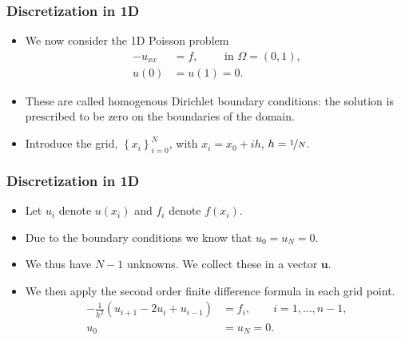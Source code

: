 \begin{frame}[fragile]
  \frametitle{Discretization in 1D}
  \begin{itemize}
  \item We now consider the 1D Poisson problem
    \[
      \begin{split}
        -u_{xx} &= f, \qquad \text{ in } \Omega = (0,1), \\
        u(0) &= u(1) = 0.
      \end{split}
    \]
    \begin{center}
      \scalebox{0.7}{}
    \end{center}
  \item These are called homogenous Dirichlet boundary conditions: the solution
    is prescribed to be zero on the boundaries of the domain.
  \item Introduce the grid, $\left\{x_i\right\}_{i=0}^N$, with $x_i = x_0+ih$,
    $h = \nicefrac{1}{N}$.
    \begin{center}
      
    \end{center}
  \end{itemize}
\end{frame}

\begin{frame}
  \frametitle{Discretization in 1D}
  \begin{itemize}
  \item Let $u_i$ denote $u(x_i)$ and $f_i$ denote $f(x_i)$.
  \item Due to the boundary conditions we know that $u_0 = u_N = 0$.
  \item We thus have $N-1$ unknowns. We collect these in a vector $\bm u$.
  \item We then apply the second order finite difference formula in each grid
    point.
    \begin{align*}
      - \frac{1}{h^2} \left(u_{i+1} - 2u_i + u_{i-1} \right) &= f_i, \qquad i=1,\ldots,n-1, \\
      u_0 &= u_N = 0.
    \end{align*}
  \end{itemize}
\end{frame}


